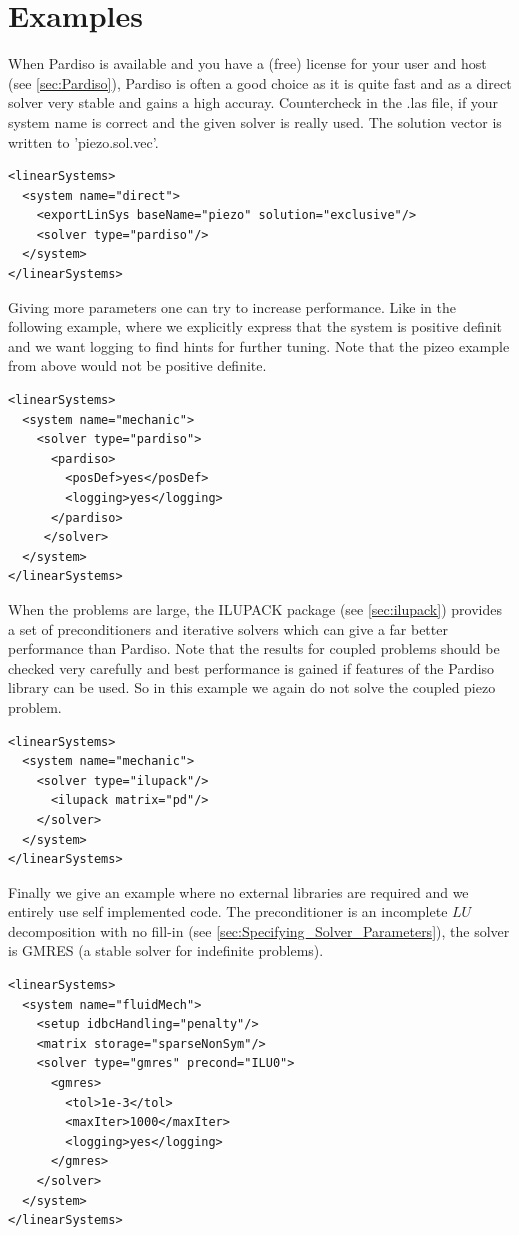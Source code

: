 %
%

\section{Examples}
\label{sec:SP_Examples}
When Pardiso is available and you have a (free) license for your user and host (see \ref{sec:Pardiso}), Pardiso is often a good choice as it is quite fast and as a direct solver very stable and gains a high accuray. Countercheck in the .las file, if your system name is correct and the given solver is really used. The solution vector is written to 'piezo.sol.vec'. 
\begin{verbatim}
<linearSystems>
  <system name="direct">
    <exportLinSys baseName="piezo" solution="exclusive"/>
    <solver type="pardiso"/>
  </system>
</linearSystems>
\end{verbatim}
Giving more parameters one can try to increase performance. Like in the following example, where we explicitly express that the system is positive definit and we want logging to find hints for further tuning. Note that the pizeo example from above would not be positive definite.
\begin{verbatim}
<linearSystems>
  <system name="mechanic">
    <solver type="pardiso">
      <pardiso>
        <posDef>yes</posDef>
        <logging>yes</logging>
      </pardiso>
     </solver>
  </system>
</linearSystems>
\end{verbatim}


When the problems are large, the ILUPACK package (see \ref{sec:ilupack}) provides a set of preconditioners and iterative solvers which can give a far better performance than Pardiso. Note that the results for coupled problems should be checked very carefully and best performance is gained if features of the Pardiso library can be used. So in this example we again do not solve the coupled piezo problem.
\begin{verbatim}
<linearSystems>
  <system name="mechanic">
    <solver type="ilupack"/>
      <ilupack matrix="pd"/>
    </solver>
  </system>
</linearSystems>
\end{verbatim}


Finally we give an example where no external libraries are required and we entirely use self implemented code. The preconditioner is an incomplete $LU$ decomposition with no fill-in (see \ref{sec:Specifying_Solver_Parameters}), the solver is GMRES (a stable solver for indefinite problems).
\begin{verbatim}
<linearSystems>
  <system name="fluidMech">
    <setup idbcHandling="penalty"/>
    <matrix storage="sparseNonSym"/>
    <solver type="gmres" precond="ILU0">
      <gmres>
        <tol>1e-3</tol>
        <maxIter>1000</maxIter>
        <logging>yes</logging>
      </gmres>
    </solver>
  </system>
</linearSystems>
\end{verbatim}

